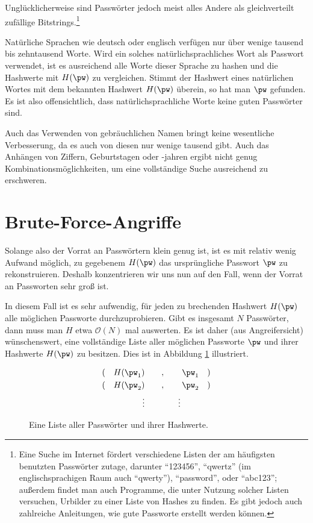 Unglücklicherweise sind Passwörter jedoch meist alles Andere als gleichverteilt zufällige Bitstrings.\footnote{%
Eine Suche im Internet fördert verschiedene Listen der am häufigsten benutzten Passwörter zutage, darunter "`123456"', "`qwertz"' (im englischsprachigen Raum auch "`qwerty"'), "`password"', oder "`abc123"'; außerdem findet man auch Programme, die unter Nutzung solcher Listen versuchen, Urbilder zu einer Liste von Hashes zu finden. Es gibt jedoch auch zahlreiche Anleitungen, wie gute Passworte erstellt werden können.
}

Natürliche Sprachen wie deutsch oder englisch verfügen nur über wenige tausend bis zehntausend Worte.
Wird ein solches natürlichsprachliches Wort als Passwort verwendet, ist es ausreichend alle Worte dieser Sprache zu hashen und die Hashwerte mit $H(\pw)$ zu vergleichen. Stimmt der Hashwert eines natürlichen Wortes mit dem bekannten Hashwert $H(\pw)$ überein, so hat man $\pw$ gefunden.
Es ist also offensichtlich, dass natürlichsprachliche Worte keine guten Passwörter sind.

Auch das Verwenden von gebräuchlichen Namen bringt keine wesentliche Verbesserung, da es auch von diesen nur wenige tausend gibt. Auch das Anhängen von Ziffern, Geburtstagen oder -jahren ergibt nicht genug Kombinationsmöglichkeiten, um eine vollständige Suche ausreichend zu erschweren.

\section{Brute-Force-Angriffe}

Solange also der Vorrat an Passwörtern klein genug ist, ist es mit relativ wenig Aufwand möglich, zu gegebenem $H(\pw)$ das ursprüngliche Passwort $\pw$ zu rekonstruieren. Deshalb konzentrieren wir uns nun auf den Fall, wenn der Vorrat an Passworten sehr groß ist.

In diesem Fall ist es sehr aufwendig, für jeden zu brechenden Hashwert $H(\pw)$ alle möglichen Passworte durchzuprobieren. Gibt es insgesamt $N$ Passwörter, dann muss man $H$ etwa $\mathcal{O}(N)$ mal auswerten. Es ist daher (aus Angreifersicht) wünschenswert, eine vollständige Liste aller möglichen Passworte $\pw$ und ihrer Hashwerte $H(\pw)$ zu besitzen. Dies ist in Abbildung \ref{fig:auth:listofhashes} illustriert.

\begin{figure}[h]
	\begin{align*}
      (\quad H(\pw_1) \qquad&,\qquad \pw_1 \quad) \\
      (\quad H(\pw_2) \qquad&,\qquad \pw_2 \quad) \\
      \vdots \qquad&\qquad \vdots
    \end{align*}
    \caption{Eine Liste aller Passwörter und ihrer Hashwerte.}
    \label{fig:auth:listofhashes}
\end{figure}


